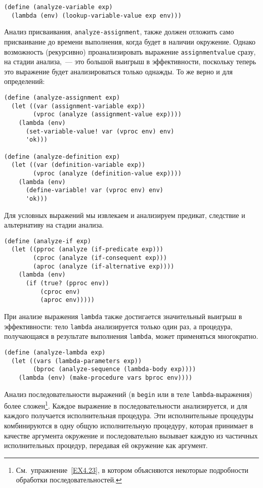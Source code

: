 \begin{Verbatim}[fontsize=\small]
(define (analyze-variable exp)
  (lambda (env) (lookup-variable-value exp env)))
\end{Verbatim}

Анализ присваивания, {\tt analyze-assignment}, также
должен отложить само присваивание до времени выполнения, когда будет в
наличии окружение.  Однако возможность (рекурсивно) проанализировать выражение
{\tt assignment\-value} %
сразу, на стадии анализа,~--- это большой выигрыш в эффективности,
поскольку теперь это выражение будет анализироваться только однажды.
То же верно и для определений:

\begin{Verbatim}[fontsize=\small]
(define (analyze-assignment exp)
  (let ((var (assignment-variable exp))
        (vproc (analyze (assignment-value exp))))
    (lambda (env)
      (set-variable-value! var (vproc env) env)
      'ok)))

(define (analyze-definition exp)
  (let ((var (definition-variable exp))
        (vproc (analyze (definition-value exp))))
    (lambda (env)
      (define-variable! var (vproc env) env)
      'ok)))
\end{Verbatim}

Для условных выражений мы извлекаем и анализируем
предикат, следствие и альтернативу на стадии анализа.

\begin{Verbatim}[fontsize=\small]
(define (analyze-if exp)
  (let ((pproc (analyze (if-predicate exp)))
        (cproc (analyze (if-consequent exp)))
        (aproc (analyze (if-alternative exp))))
    (lambda (env)
      (if (true? (pproc env))
          (cproc env)
          (aproc env)))))
\end{Verbatim}

При анализе выражения {\tt lambda} также достигается
значительный выигрыш в эффективности: тело {\tt lambda}
анализируется только один раз, а процедура, получающаяся в результате
выполнения {\tt lambda}, может применяться многократно.

\begin{Verbatim}[fontsize=\small]
(define (analyze-lambda exp)
  (let ((vars (lambda-parameters exp))
        (bproc (analyze-sequence (lambda-body exp))))
    (lambda (env) (make-procedure vars bproc env))))
\end{Verbatim}

Анализ последовательности выражений (в {\tt begin}
или в теле {\tt lambda}-вы\-ра\-же\-ния) более 
сложен\footnote{См.~упражнение~\ref{EX4.23}, в котором
объясняются некоторые подробности обработки по\-сле\-до\-ва\-тель\-нос\-тей.}.
Каждое выражение в последовательности анализируется, и для каждого получается
исполнительная процедура. Эти исполнительные процедуры комбинируются в одну
общую исполнительную процедуру, которая принимает в качестве аргумента
окружение и последовательно вызывает каждую из частичных исполнительных
процедур, передавая ей окружение как аргумент.

